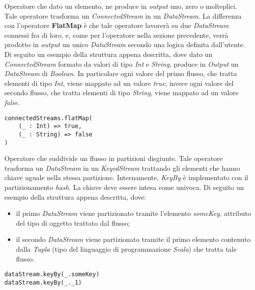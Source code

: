 	
Operatore che dato un elemento, ne produce in \textit{output} uno, zero o molteplici. Tale operatore trasforma un \textit{ConnectedStream} in un \textit{DataStream}. La differenza con l'operatore \textbf{FlatMap} è che tale operatore lavorerà su due \textit{DataStream} connessi fra di loro, e, come per l'operatore nella sezione precedente, verrà prodotto in \textit{output} un unico \textit{DataStream} secondo una logica definita dall'utente. Di seguito un esempio della struttura appena descritta, dove dato un \textit{ConnectedStream} formato da valori di tipo \textit{Int} e \textit{String}, produce in \textit{Output} un \textit{DataStream} di \textit{Boolean}. In particolare ogni valore del primo flusso, che tratta elementi di tipo \textit{Int}, viene mappato ad un valore \textit{true}, invece ogni valore del secondo flusso, che tratta elementi di tipo \textit{String}, viene mappato ad un valore \textit{false}.

\begin{verbatim}
connectedStreams.flatMap(
    (_ : Int) => true,
    (_ : String) => false
)
\end{verbatim}

Operatore che suddivide un flusso in partizioni disgiunte. Tale operatore trasforma un \textit{DataStream} in un \textit{KeyedStream} trattando gli elementi che hanno chiave uguale nella stessa partizione. Internamente, \textit{KeyBy} è implementato con il partizionamento \textit{hash}.
La chiave deve essere intesa come univoca.
Di seguito un esempio della struttura appena descritta, dove:
\begin{itemize}
	\item{il primo \textit{DataStream} viene partizionato tramite l'elemento \textit{someKey}, attributo del tipo di oggetto trattato dal flusso;}
	\item{il secondo \textit{DataStream} viene partizionato tramite il primo elemento contenuto dalla \textit{Tupla} (tipo del linguaggio di programmazione \textit{Scala}) che tratta tale flusso.}
\end{itemize}

\begin{verbatim}
dataStream.keyBy(_.someKey)
dataStream.keyBy(_._1)
\end{verbatim}

